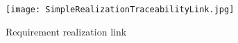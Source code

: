 \begin{figure}
\centering
\texttt{[image: SimpleRealizationTraceabilityLink.jpg]}
\caption{Requirement realization link}
\label{fig:RequirementRealizationLink}
\end{figure}